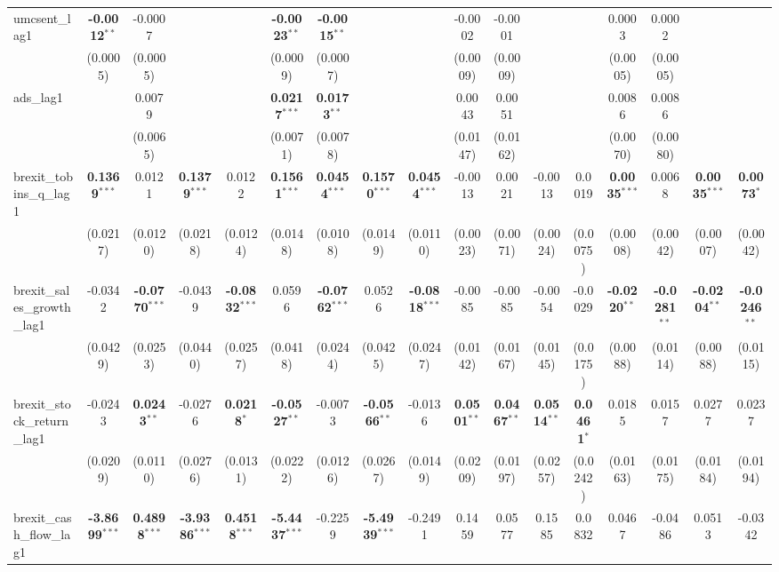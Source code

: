 \begin{landscape}
\begin{table}[H]
\begin{tabular}{lcccccccccccccccc}
umcsent\_lag1 & \textbf{-0.0012}$^{**}$ & -0.0007 &  &  & \textbf{-0.0023}$^{**}$ & \textbf{-0.0015}$^{**}$ &  &  & -0.0002 & -0.0001 &  &  & 0.0003 & 0.0002 &  &  \\
 & (0.0005) & (0.0005) &  &  & (0.0009) & (0.0007) &  &  & (0.0009) & (0.0009) &  &  & (0.0005) & (0.0005) &  &  \\
ads\_lag1 &  & 0.0079 &  &  & \textbf{0.0217}$^{***}$ & \textbf{0.0173}$^{**}$ &  &  & 0.0043 & 0.0051 &  &  & 0.0086 & 0.0086 &  &  \\
 &  & (0.0065) &  &  & (0.0071) & (0.0078) &  &  & (0.0147) & (0.0162) &  &  & (0.0070) & (0.0080) &  &  \\
brexit\_tobins\_q\_lag1 & \textbf{0.1369}$^{***}$ & 0.0121 & \textbf{0.1379}$^{***}$ & 0.0122 & \textbf{0.1561}$^{***}$ & \textbf{0.0454}$^{***}$ & \textbf{0.1570}$^{***}$ & \textbf{0.0454}$^{***}$ & -0.0013 & 0.0021 & -0.0013 & 0.0019 & \textbf{0.0035}$^{***}$ & 0.0068 & \textbf{0.0035}$^{***}$ & \textbf{0.0073}$^{*}$ \\
 & (0.0217) & (0.0120) & (0.0218) & (0.0124) & (0.0148) & (0.0108) & (0.0149) & (0.0110) & (0.0023) & (0.0071) & (0.0024) & (0.0075) & (0.0008) & (0.0042) & (0.0007) & (0.0042) \\
brexit\_sales\_growth\_lag1 & -0.0342 & \textbf{-0.0770}$^{***}$ & -0.0439 & \textbf{-0.0832}$^{***}$ & 0.0596 & \textbf{-0.0762}$^{***}$ & 0.0526 & \textbf{-0.0818}$^{***}$ & -0.0085 & -0.0085 & -0.0054 & -0.0029 & \textbf{-0.0220}$^{**}$ & \textbf{-0.0281}$^{**}$ & \textbf{-0.0204}$^{**}$ & \textbf{-0.0246}$^{**}$ \\
 & (0.0429) & (0.0253) & (0.0440) & (0.0257) & (0.0418) & (0.0244) & (0.0425) & (0.0247) & (0.0142) & (0.0167) & (0.0145) & (0.0175) & (0.0088) & (0.0114) & (0.0088) & (0.0115) \\
brexit\_stock\_return\_lag1 & -0.0243 & \textbf{0.0243}$^{**}$ & -0.0276 & \textbf{0.0218}$^{*}$ & \textbf{-0.0527}$^{**}$ & -0.0073 & \textbf{-0.0566}$^{**}$ & -0.0136 & \textbf{0.0501}$^{**}$ & \textbf{0.0467}$^{**}$ & \textbf{0.0514}$^{**}$ & \textbf{0.0461}$^{*}$ & 0.0185 & 0.0157 & 0.0277 & 0.0237 \\
 & (0.0209) & (0.0110) & (0.0276) & (0.0131) & (0.0222) & (0.0126) & (0.0267) & (0.0149) & (0.0209) & (0.0197) & (0.0257) & (0.0242) & (0.0163) & (0.0175) & (0.0184) & (0.0194) \\
brexit\_cash\_flow\_lag1 & \textbf{-3.8699}$^{***}$ & \textbf{0.4898}$^{***}$ & \textbf{-3.9386}$^{***}$ & \textbf{0.4518}$^{***}$ & \textbf{-5.4437}$^{***}$ & -0.2259 & \textbf{-5.4939}$^{***}$ & -0.2491 & 0.1459 & 0.0577 & 0.1585 & 0.0832 & 0.0467 & -0.0486 & 0.0513 & -0.0342 \\

\end{tabular}
\end{table}
\end{landscape}
